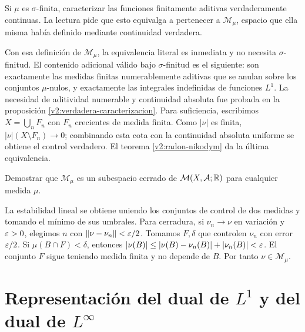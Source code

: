\begin{ejercicio}\label{ej:v2-l27-2}
Si $\mu$ es $\sigma$-finita, caracterizar las funciones finitamente aditivas verdaderamente continuas. La lectura pide que esto equivalga a pertenecer a $\mathcal M_\mu$, espacio que ella misma había definido mediante continuidad verdadera.
\end{ejercicio}
\begin{solucion}
Con esa definición de $\mathcal M_\mu$, la equivalencia literal es inmediata y no necesita $\sigma$-finitud. El contenido adicional válido bajo $\sigma$-finitud es el siguiente: son exactamente las medidas finitas numerablemente aditivas que se anulan sobre los conjuntos $\mu$-nulos, y exactamente las integrales indefinidas de funciones $L^1$. La necesidad de aditividad numerable y continuidad absoluta fue probada en la proposición \ref{v2:verdadera-caracterizacion}. Para suficiencia, escribimos $X=\bigcup_nF_n$ con $F_n$ crecientes de medida finita. Como $|\nu|$ es finita, $|\nu|(X\setminus F_n)\to0$; combinando esta cota con la continuidad absoluta uniforme se obtiene el control verdadero. El teorema \ref{v2:radon-nikodym} da la última equivalencia.
\end{solucion}

\begin{ejercicio}\label{ej:v2-l27-3}
Demostrar que $\mathcal M_\mu$ es un subespacio cerrado de $\mathcal M(X,\mathcal A;\mathbb R)$ para cualquier medida $\mu$.
\end{ejercicio}
\begin{solucion}
La estabilidad lineal se obtiene uniendo los conjuntos de control de dos medidas y tomando el mínimo de sus umbrales. Para cerradura, si $\nu_n\to\nu$ en variación y $\varepsilon>0$, elegimos $n$ con $\left\lVert\nu-\nu_n\right\rVert<\varepsilon/2$. Tomamos $F,\delta$ que controlen $\nu_n$ con error $\varepsilon/2$. Si $\mu(B\cap F)<\delta$, entonces $|\nu(B)|\le|\nu(B)-\nu_n(B)|+|\nu_n(B)|<\varepsilon$. El conjunto $F$ sigue teniendo medida finita y no depende de $B$. Por tanto $\nu\in\mathcal M_\mu$.
\end{solucion}

\chapter{Representación del dual de \texorpdfstring{$L^1$}{L1} y del dual de \texorpdfstring{$L^\infty$}{L infinito}}

